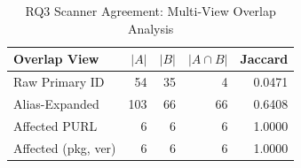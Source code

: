 \begin{table}[htbp]
\caption{RQ3 Scanner Agreement: Multi-View Overlap Analysis}
\label{tab:rq3-agreement}
\centering\small
\begin{tabular}{lrrrr}
\toprule
\textbf{Overlap View} & \textbf{$|A|$} & \textbf{$|B|$} & \textbf{$|A \cap B|$} & \textbf{Jaccard} \\
\midrule
  Raw Primary ID & 54 & 35 & 4 & 0.0471 \\
  Alias-Expanded & 103 & 66 & 66 & 0.6408 \\
  Affected PURL & 6 & 6 & 6 & 1.0000 \\
  Affected (pkg, ver) & 6 & 6 & 6 & 1.0000 \\
\bottomrule
\end{tabular}
\end{table}
